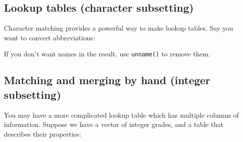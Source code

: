 \subsection{Lookup tables (character subsetting)}\label{lookup-tables}

Character matching provides a powerful way to make lookup tables. Say
you want to convert abbreviations: 

\begin{Shaded}
\begin{Highlighting}[]
\StringTok{ }\NormalTok{(}\NormalTok{, }\NormalTok{, }\NormalTok{, }\NormalTok{, }\NormalTok{, }\NormalTok{, }\NormalTok{)}
\StringTok{ }\NormalTok{(} \NormalTok{, } \NormalTok{, } \NormalTok{)}

\NormalTok{(} \NormalTok{, } \NormalTok{, } \NormalTok{)[x]}
\end{Highlighting}
\end{Shaded}

If you don't want names in the result, use \texttt{unname()} to remove
them.

\subsection{Matching and merging by hand (integer
subsetting)}\label{matching-merging}

You may have a more complicated lookup table which has multiple columns
of information. Suppose we have a vector of integer grades, and a table
that describes their properties: 

